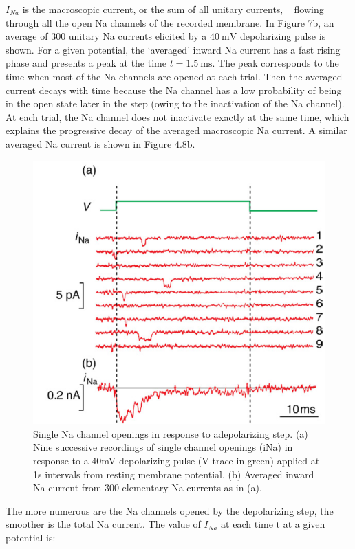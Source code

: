 \documentclass[../../Orator]{subfiles}
\begin{document}
\(I_{Na}\) is the macroscopic current, or the sum of all unitary currents, \unit{\cur\sodium} flowing through all the open \gls{Na} channels of the recorded membrane. In Figure 7b, an average of \(\num{300}\) unitary \gls{Na} currents elicited by a \(\qty{40}{\mV}\) depolarizing pulse is shown. For a given potential, the ‘averaged’ inward \gls{Na} current has a fast rising phase and presents a peak at the time \(t=\qty{1.5}{\ms}\). The peak corresponds to the time when most of the \gls{Na} channels are opened at each trial. Then the averaged current decays with time because the \gls{Na} channel has a low probability of being in the open state later in the step (owing to the inactivation of the \gls{Na} channel). At each trial, the \gls{Na} channel does not inactivate exactly at the same time, which explains the progressive decay of the averaged macroscopic \gls{Na} current. A similar averaged \gls{Na} current is shown in Figure 4.8b. %

\begin{figure}[H]
    \centering
    \includegraphics[width=0.5\linewidth]{Pictures//Anakin/iNa.png}
    \caption{Single \gls{Na} channel openings in response to adepolarizing step. (a) Nine successive recordings of single channel openings (iNa) in response to a 40mV depolarizing pulse (V trace in green) applied at 1s intervals from resting membrane potential. (b) Averaged inward \gls{Na} current from 300 elementary \gls{Na} currents as in (a).  }
    \label{fig:enter-label}
\end{figure}

The more numerous are the \gls{Na} channels opened by the depolarizing step, the smoother is the total \gls{Na} current. The value of \(I_{Na}\) at each time t at a given potential is: 
\end{document}

